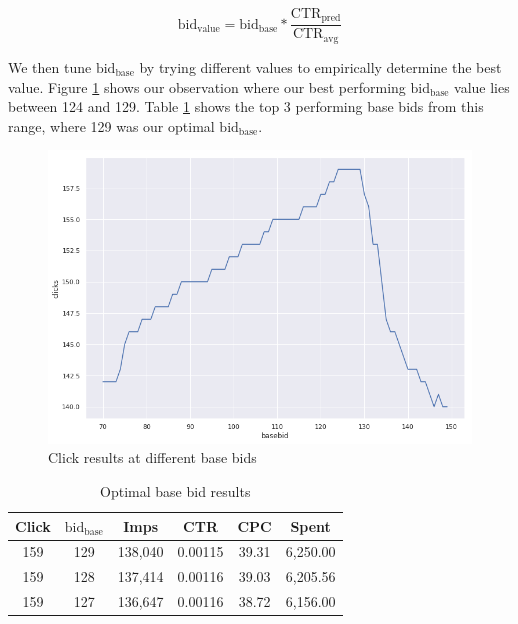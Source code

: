 \documentclass{sig-alternate-05-2015}
\begin{document}
\begin{equation} \label{eq:linear-eq}
\mathrm{bid}_\mathrm{value} = \mathrm{bid}_\mathrm{base} * \frac{\mathrm{CTR}_\mathrm{pred}}{\mathrm{CTR}_\mathrm{avg}}  
\end{equation}

We then tune $\mathrm{bid}_\mathrm{base}$ by trying different values to empirically determine the best value. Figure \ref{fig:linear-basebid-tune} shows our observation where our best performing $\mathrm{bid}_\mathrm{base}$ value lies between 124 and 129. Table \ref{table:linear-basebid-tune} shows the top 3 performing base bids from this range, where 129 was our optimal $\mathrm{bid}_\mathrm{base}$.

\begin{figure}[h!]
	\centering
	\includegraphics[width=\linewidth]{images/linear_bid_tuning.png}
	\caption{Click results at different base bids}
	\label{fig:linear-basebid-tune}
\end{figure}

\begin{table}[ht]
  \centering
	\caption{Optimal base bid results}
	\label{table:linear-basebid-tune}
		\begin{tabular}{c c c c c c}
			\hline
			Click & $\mathrm{bid}_\mathrm{base}$ & Imps & CTR & CPC & Spent \\
			\hline
            159 & 129 & 138,040 & 0.00115 & 39.31 & 	6,250.00 \\
           	159 & 128 & 137,414 & 0.00116 & 39.03 & 	6,205.56 \\
            159 & 127 & 136,647 & 0.00116 & 38.72 & 	6,156.00 \\
            \hline
		\end{tabular}
\end{table}
\end{document}
